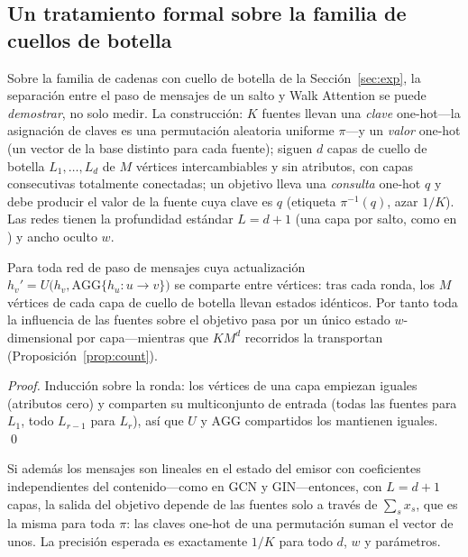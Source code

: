 \documentclass[runningheads]{llncs}
\begin{document}
\subsection{Un tratamiento formal sobre la familia de cuellos de botella}
\label{sec:theory}

Sobre la familia de cadenas con cuello de botella de la Sección~\ref{sec:exp},
la separación entre el paso de mensajes de un salto y Walk Attention se puede
\emph{demostrar}, no solo medir. La construcción: $K$ fuentes llevan una
\emph{clave} one-hot---la asignación de claves es una permutación aleatoria
uniforme $\pi$---y un \emph{valor} one-hot (un vector de la base distinto para cada fuente); siguen $d$ capas de cuello de
botella $L_1,\dots,L_d$ de $M$ vértices intercambiables y sin atributos, con
capas consecutivas totalmente conectadas; un objetivo lleva una \emph{consulta}
one-hot $q$ y debe producir el valor de la fuente cuya clave es $q$ (etiqueta
$\pi^{-1}(q)$, azar $1/K$). Las redes tienen la profundidad estándar $L=d+1$
(una capa por salto, como en \cite{alon2021bottleneck}) y ancho oculto $w$.

\begin{proposition}\label{prop:collapse}
Para toda red de paso de mensajes cuya actualización
$h_v'=U\bigl(h_v,\mathrm{AGG}\{h_u:u\to v\}\bigr)$ se comparte entre vértices:
tras cada ronda, los $M$ vértices de cada capa de cuello de botella llevan
estados idénticos. Por tanto toda la influencia de las fuentes sobre el
objetivo pasa por un único estado $w$-dimensional por capa---mientras que
$KM^{d}$ recorridos la transportan (Proposición~\ref{prop:count}).
\end{proposition}

\begin{proof}
Inducción sobre la ronda: los vértices de una capa empiezan iguales (atributos
cero) y comparten su multiconjunto de entrada (todas las fuentes para $L_1$,
todo $L_{r-1}$ para $L_r$), así que $U$ y $\mathrm{AGG}$ compartidos los
mantienen iguales. \qed
\end{proof}

\begin{proposition}\label{prop:blind}
Si además los mensajes son lineales en el estado del emisor con coeficientes
independientes del contenido---como en GCN y GIN---entonces, con $L=d+1$ capas,
la salida del objetivo depende de las fuentes solo a través de $\sum_s x_s$,
que es la misma para toda $\pi$: las claves one-hot de una permutación suman el
vector de unos. La precisión esperada es exactamente $1/K$ para todo $d$, $w$ y
parámetros.
\end{proposition}
\end{document}
